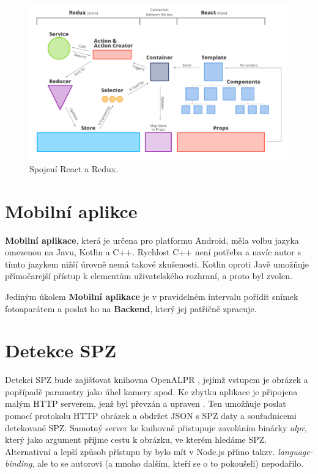 \begin{figure} \centering
\includegraphics[width=145mm]{../img/react-redux-architecture.png}
\caption{Spojení React a Redux. \citep[viz][]{react_redux_dataflow}}
\label{fig:react_redux_dataflow}
\end{figure}

\section{Mobilní aplikce} \label{mobile_app}

\textbf{Mobilní aplikace}, která je určena pro platformu Android, měla volbu jazyka omezenou na Javu, Kotlin a C++.
Rychlost C++ není potřeba a navíc autor s tímto jazykem nižší úrovně nemá takové zkušenosti.
Kotlin oproti Javě umožňuje přímočarejší přístup k elementům uživatelského rozhraní, a proto byl zvolen.

Jediným úkolem \textbf{Mobilní aplikace} je v pravidelném intervalu pořídit snímek fotoaparátem a poslat ho na
\textbf{Backend}, který jej patřičně zpracuje.





\section{Detekce SPZ}

Detekci SPZ bude zajišťovat knihovna OpenALPR \citep[viz][]{OpenALPR}, jejímž vstupem je obrázek a popřípadě
parametry jako úhel kamery apod. Ke zbytku aplikace je připojena malým HTTP serverem, jenž byl převzán a upraven
\citep[viz][]{OpenALPR_Server}.
Ten umožňuje poslat pomocí protokolu HTTP obrázek a obdržet JSON s SPZ daty a souřadnicemi detekované SPZ.
Samotný server ke knihovně přistupuje zavoláním binárky \textit{alpr}, který jako argument přijme cestu k
obrázku, ve kterém hledáme SPZ. Alternativní a lepší způsob přístupu by bylo mít v Node.js přímo takzv.
\textit{language-binding}, ale to se autorovi (a mnoho dalším, kteří se o to pokoušeli) nepodařilo.

